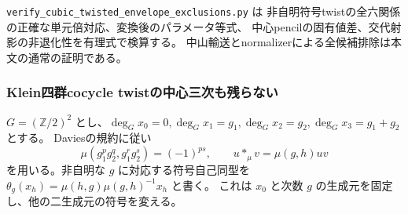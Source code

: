 \texttt{verify\_cubic\_twisted\_envelope\_\allowbreak exclusions.py} は
非自明符号twistの全六関係の正確な単元倍対応、変換後のパラメータ等式、
中心pencilの固有値差、交代射影の非退化性を有理式で検算する。
中山輸送とnormalizerによる全候補排除は本文の通常の証明である。

\subsubsection{Klein四群cocycle twistの中心三次も残らない}
$G=(\mathbb Z/2)^2$ とし、$\deg_Gx_0=0,\deg_Gx_1=g_1,
\deg_Gx_2=g_2,\deg_Gx_3=g_1+g_2$ とする。
Daviesの規約\cite[(3.4), (3.5), (4.3)]{DaviesSklyaninCocycle}に従い
\[
 \mu(g_1^pg_2^q,g_1^rg_2^s)=(-1)^{ps},\qquad
 u*_{\mu}v=\mu(g,h)uv
\]
を用いる。非自明な $g$ に対応する符号自己同型を
$\theta_g(x_h)=\mu(h,g)\mu(g,h)^{-1}x_h$ と書く。
これは $x_0$ と次数 $g$ の生成元を固定し、他の二生成元の符号を変える。

